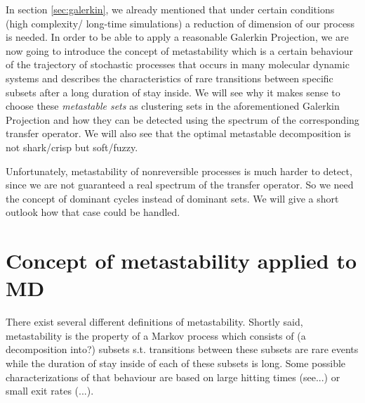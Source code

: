 \label{chap:meta}

In section \ref{sec:galerkin}, we already mentioned that under certain conditions (high complexity/ long-time simulations) a reduction of dimension of our process is needed. In order to be able to apply a reasonable Galerkin Projection, we are now going to introduce the concept of metastability which is a certain behaviour of the trajectory of  stochastic processes that occurs in many molecular dynamic systems 
and describes the characteristics of rare transitions between specific subsets after a long duration of stay inside.
We will see why it makes sense to choose these \textit{metastable sets}  as clustering sets in the aforementioned Galerkin Projection
and how they can be detected using the spectrum of the corresponding transfer operator.
We will also see that the optimal metastable decomposition is not shark/crisp but soft/fuzzy.

Unfortunately, metastability of nonreversible processes is much harder to detect, since we are not guaranteed a real spectrum of the transfer operator. So we need the concept of dominant cycles instead of dominant sets. We will give a short outlook how that case could be handled.


\section{Concept of metastability applied to MD}
\label{sec:metastability}

There exist several different definitions of metastability. Shortly said, metastability is the property of a Markov
process which consists of (a decomposition into?) subsets s.t. transitions between these subsets are rare events while the duration of stay inside of each of these subsets is long.
Some possible characterizations of that behaviour are based on large hitting times (see...) or small exit rates (...).

